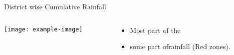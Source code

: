 \documentclass[handout,t]{beamer}
\begin{document}
\begin{frame}{District wise Cumulative Rainfall}
\begin{columns}[onlytextwidth,T]
    \begin{column}{.45\textwidth}
        \texttt{[image: example-image]}
    \end{column}
    \begin{column}{.47\textwidth}
        \begin{itemize}
            \item\justifying Most part of the
            \vspace{3pt} 
            \item\justifying   some part ofrainfall (Red zones). 
        \end{itemize}
    \end{column}
\end{columns}
\end{frame}
\end{document}
